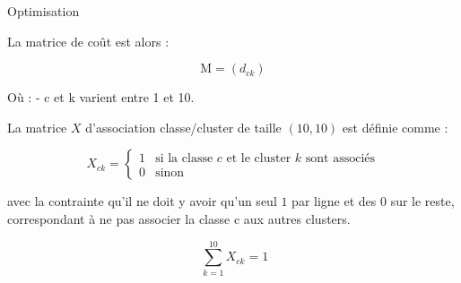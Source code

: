 \documentclass[
  ignorenonframetext,
]{beamer}
\begin{document}
\begin{frame}{}
\protect\hypertarget{section-5}{}
Optimisation

La matrice de coût est alors :

\[
\text{M} = (d_{ck}) 
\]

Où : - c et k varient entre 1 et 10.

La matrice \(X\) d'association classe/cluster de taille \((10,10)\) est
définie comme :

\[
X_{ck} = 
\begin{cases} 
1 & \text{si la classe } c \text{ et le cluster } k \text{ sont associés} \\
0 & \text{sinon} 
\end{cases}
\]

avec la contrainte qu'il ne doit y avoir qu'un seul \(1\) par ligne et
des \(0\) sur le reste, correspondant à ne pas associer la classe c aux
autres clusters.

\[
\ \sum_{k=1}^{10} X_{ck} = 1
\]
\end{frame}
\end{document}
